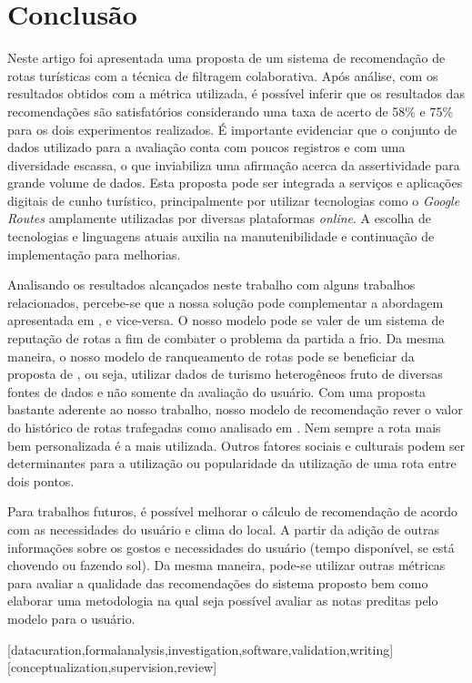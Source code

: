 \documentclass[portuguese]{textolivre}
\begin{document}
\section{Conclusão}\label{sec_7}
Neste artigo foi apresentada uma proposta de um sistema de recomendação de rotas turísticas com a técnica de filtragem colaborativa. Após análise, com os resultados obtidos com a métrica utilizada, é possível inferir que os resultados das recomendações são satisfatórios considerando uma taxa de acerto de 58\% e 75\% para os dois experimentos realizados. É importante evidenciar que o conjunto de dados utilizado para a avaliação conta com poucos registros e com uma diversidade escassa, o que inviabiliza uma afirmação acerca da assertividade para grande volume de dados. Esta proposta pode ser integrada a serviços e aplicações digitais de cunho turístico, principalmente por utilizar tecnologias como o \textit{Google Routes} amplamente utilizadas por diversas plataformas \textit{online}. A escolha de tecnologias e linguagens atuais auxilia na manutenibilidade e continuação de implementação para melhorias.


Analisando os resultados alcançados neste trabalho com alguns trabalhos relacionados, percebe-se que a nossa solução pode complementar a abordagem apresentada em \textcite{bedi2014marst}, e vice-versa. O nosso modelo pode se valer de um sistema de reputação de rotas a fim de combater o problema da partida a frio. Da mesma maneira, o nosso modelo de ranqueamento de rotas pode se beneficiar da proposta de \textcite{bin2019personalized}, ou seja, utilizar dados de turismo heterogêneos fruto de diversas fontes de dados e não somente da avaliação do usuário. Com uma proposta bastante aderente ao nosso trabalho, nosso modelo de recomendação rever o valor do histórico de rotas trafegadas como analisado em \textcite{hang2018design}. Nem sempre a rota mais bem personalizada é a mais utilizada. Outros fatores sociais e culturais podem ser determinantes para a utilização ou popularidade da utilização de uma rota entre dois pontos.


Para trabalhos futuros, é possível melhorar o cálculo de recomendação de acordo com as necessidades do usuário e clima do local. A partir da adição de outras informações sobre os gostos e necessidades do usuário (tempo disponível, se está chovendo ou fazendo sol). Da mesma maneira, pode-se utilizar outras métricas para avaliar a qualidade das recomendações do sistema proposto bem como elaborar uma metodologia na qual seja possível avaliar as notas preditas pelo modelo para o usuário.



\printbibliography\label{article}

\begin{contributors}
[datacuration,formalanalysis,investigation,software,validation,writing]
[conceptualization,supervision,review]
\end{contributors}
\end{document}
